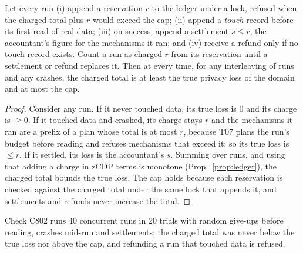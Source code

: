 \setcounter{proposition}{801}
\begin{proposition}\label{prop:reserve}
Let every run (i) append a reservation $r$ to the ledger under a lock, refused when the charged total plus $r$ would exceed the cap; (ii) append a \emph{touch} record before its first read of real data; (iii) on success, append a settlement $s\le r$, the accountant's figure for the mechanisms it ran; and (iv) receive a refund only if no touch record exists. Count a run as charged $r$ from its reservation until a settlement or refund replaces it. Then at every time, for any interleaving of runs and any crashes, the charged total is at least the true privacy loss of the domain and at most the cap.
\end{proposition}
\begin{proof}
Consider any run. If it never touched data, its true loss is $0$ and its charge is $\ge0$. If it touched data and crashed, its charge stays $r$ and the mechanisms it ran are a prefix of a plan whose total is at most $r$, because T07 plans the run's budget before reading and refuses mechanisms that exceed it; so its true loss is $\le r$. If it settled, its loss is the accountant's $s$. Summing over runs, and using that adding a charge in zCDP terms is monotone (Prop.~\ref{prop:ledger}), the charged total bounds the true loss. The cap holds because each reservation is checked against the charged total under the same lock that appends it, and settlements and refunds never increase the total.
\end{proof}
\noindent Check C802 runs 40 concurrent runs in 20 trials with random give-ups before reading, crashes mid-run and settlements; the charged total was never below the true loss nor above the cap, and refunding a run that touched data is refused.

